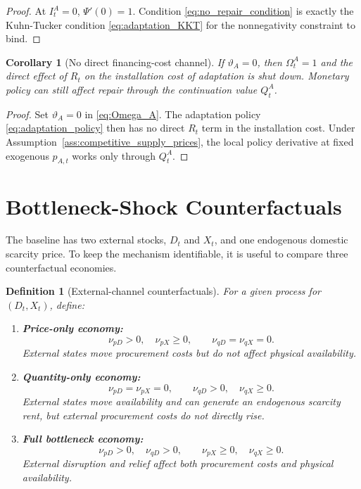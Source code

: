 ﻿\documentclass[12pt]{article}
\newtheorem{definition}{Definition}
\newtheorem{corollary}{Corollary}
\theoremstyle{remark}
\begin{document}
\begin{proof}
At $I_t^A=0$, $\Psi'(0)=1$. Condition \eqref{eq:no_repair_condition} is exactly the
Kuhn-Tucker condition \eqref{eq:adaptation_KKT} for the nonnegativity constraint to bind.
\end{proof}

\begin{corollary}[No direct financing-cost channel]\label{cor:no_direct_financing}
If $\vartheta_A=0$, then $\Omega_t^A=1$ and the direct effect of $R_t$ on the installation cost of
adaptation is shut down. Monetary policy can still affect repair through the continuation value
$Q_t^A$.
\end{corollary}

\begin{proof}
Set $\vartheta_A=0$ in \eqref{eq:Omega_A}. The adaptation policy
\eqref{eq:adaptation_policy} then has no direct $R_t$ term in the installation cost. Under
Assumption~\ref{ass:competitive_supply_prices}, the local policy derivative at fixed exogenous
$p_{A,t}$ works only through $Q_t^A$.
\end{proof}

\section{Bottleneck-Shock Counterfactuals}

The baseline has two external stocks, $D_t$ and $X_t$, and one endogenous domestic scarcity price.
To keep the mechanism identifiable, it is useful to compare three counterfactual economies.

\begin{definition}[External-channel counterfactuals]\label{def:counterfactuals}
For a given process for $(D_t,X_t)$, define:
\begin{enumerate}[leftmargin=1.5em]
    \item \textbf{Price-only economy:}
    \begin{equation}
        \nu_{pD}>0,\quad \nu_{pX}\ge 0,
        \qquad
        \nu_{qD}=\nu_{qX}=0.
        \label{eq:price_only}
    \end{equation}
    External states move procurement costs but do not affect physical availability.
    \item \textbf{Quantity-only economy:}
    \begin{equation}
        \nu_{pD}=\nu_{pX}=0,
        \qquad
        \nu_{qD}>0,\quad \nu_{qX}\ge 0.
        \label{eq:quantity_only}
    \end{equation}
    External states move availability and can generate an endogenous scarcity rent, but
    external procurement costs do not directly rise.
    \item \textbf{Full bottleneck economy:}
    \begin{equation}
        \nu_{pD}>0,\quad \nu_{qD}>0,
        \qquad
        \nu_{pX}\ge 0,\quad \nu_{qX}\ge 0.
        \label{eq:full_bottleneck}
    \end{equation}
    External disruption and relief affect both procurement costs and physical availability.
\end{enumerate}
\end{definition}
\end{document}
